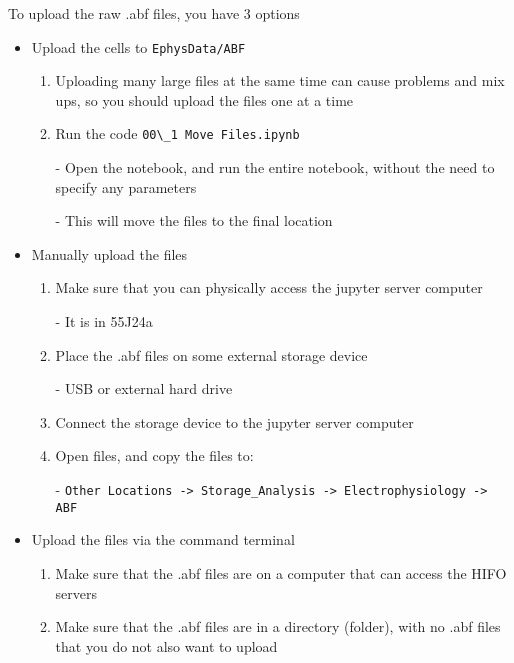 \documentclass{article}
\begin{document}
To upload the raw .abf files, you have 3 options
\begin{itemize}
    \item Upload the cells to \verb|EphysData/ABF|
    
    \begin{enumerate}
        \item Uploading many large files at the same time can cause problems and mix ups, so you should upload the files one at a time
        
        \item Run the code \verb|00\_1 Move Files.ipynb|
        
        - Open the notebook, and run the entire notebook, without the need to specify any parameters
        
        - This will move the files to the final location
    \end{enumerate}
    
    \item Manually upload the files
    
    \begin{enumerate}
        \item Make sure that you can physically access the jupyter server computer
        
        - It is in 55J24a
        
        \item Place the .abf files on some external storage device
        
        - USB or external hard drive
        
        \item Connect the storage device to the jupyter server computer
        
        \item Open files, and copy the files to:

        - \verb|Other Locations -> Storage_Analysis -> Electrophysiology -> ABF|
    \end{enumerate}
    
    \item Upload the files via the command terminal
    
    \begin{enumerate}
        \item Make sure that the .abf files are on a computer that can access the HIFO servers
        
        \item Make sure that the .abf files are in a directory (folder), with no .abf files that you do not also want to upload
        

\end{enumerate}
\end{itemize}
\end{document}
